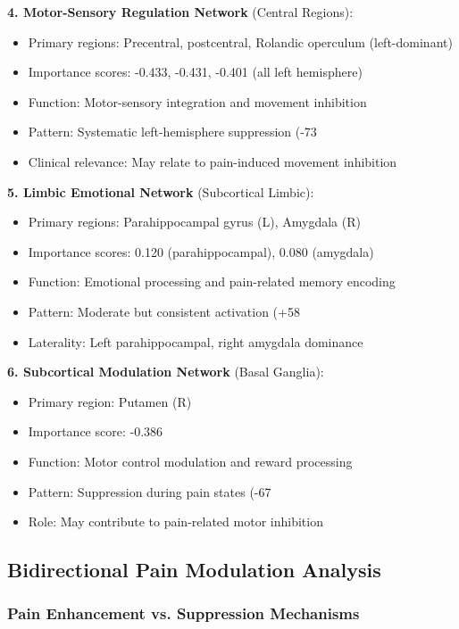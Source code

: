 \documentclass[10pt,journal,compsoc]{IEEEtran}
\begin{document}
\textbf{4. Motor-Sensory Regulation Network} (Central Regions):
\begin{itemize}
\item Primary regions: Precentral, postcentral, Rolandic operculum (left-dominant)
\item Importance scores: -0.433, -0.431, -0.401 (all left hemisphere)
\item Function: Motor-sensory integration and movement inhibition
\item Pattern: Systematic left-hemisphere suppression (-73%
\item Clinical relevance: May relate to pain-induced movement inhibition
\end{itemize}

\textbf{5. Limbic Emotional Network} (Subcortical Limbic):
\begin{itemize}
\item Primary regions: Parahippocampal gyrus (L), Amygdala (R)
\item Importance scores: 0.120 (parahippocampal), 0.080 (amygdala)
\item Function: Emotional processing and pain-related memory encoding
\item Pattern: Moderate but consistent activation (+58%
\item Laterality: Left parahippocampal, right amygdala dominance
\end{itemize}

\textbf{6. Subcortical Modulation Network} (Basal Ganglia):
\begin{itemize}
\item Primary region: Putamen (R)
\item Importance score: -0.386
\item Function: Motor control modulation and reward processing
\item Pattern: Suppression during pain states (-67%
\item Role: May contribute to pain-related motor inhibition
\end{itemize}

\subsection{Bidirectional Pain Modulation Analysis}

\subsubsection{Pain Enhancement vs. Suppression Mechanisms}
\end{document}
